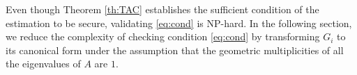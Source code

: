 \documentclass{ieeetrans}   %
\newcommand{\Rb}{{\mathbb{R}}}
\newcommand{\Ic}{{\mathcal{I}}}
\begin{document}
Even though Theorem \ref{th:TAC} establishes the sufficient condition of the estimation to be secure, validating \eqref{eq:cond} is NP-hard.
In the following section, we reduce the complexity of checking condition \eqref{eq:cond} by transforming $G_i$ to its canonical form under the assumption that the geometric multiplicities of all the eigenvalues of $A$ are $1$. 

\end{document}
